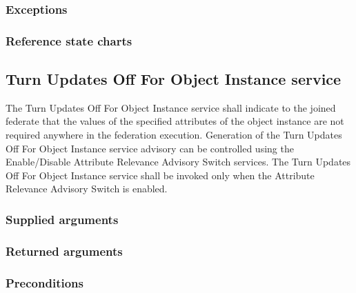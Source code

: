 \begin{compactstdpage}

    \subsubsection{Exceptions}



    \subsubsection{Reference state charts}



    \subsection{Turn Updates Off For Object Instance \rtiinitiated{} service}


    The Turn Updates Off For Object Instance \rtiinitiated{} service shall indicate to the joined federate that the values of the specified attributes of the object instance are not required anywhere in the federation execution. Generation of the Turn Updates Off For Object Instance \rtiinitiated{} service advisory can be controlled using the Enable/Disable Attribute Relevance Advisory Switch services. The Turn Updates Off For Object Instance \rtiinitiated{} service shall be invoked only when the Attribute Relevance Advisory Switch is enabled.

    \subsubsection{Supplied arguments}



    \subsubsection{Returned arguments}



    \subsubsection{Preconditions}



\end{compactstdpage}
